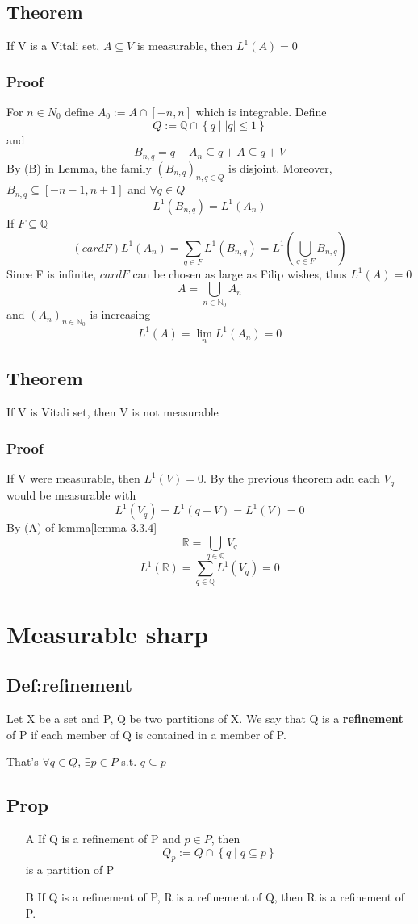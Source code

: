 \documentclass{book}
\newcommand{\abs}[1]{\left\lvert #1 \right\rvert}
\newcommand{\set}[1]{\left\{#1\right\}}
\begin{document}
\section{Theorem}
If V is a Vitali set, $A\subseteq V$ is measurable, then $L^1(A)=0$
\subsection*{Proof}
For $n\in N_0$ define $A_0:=A\cap[-n,n]$ which is integrable. Define $$Q:=\mathbb Q\cap\set{q\mid\abs{q}\leq 1}$$and $$B_{n,q}=q+A_n\subseteq q+A\subseteq q+V$$
By (B) in Lemma, the family $(B_{n,q})_{n,q\in Q}$ is disjoint. Moreover, $B_{n,q}\subseteq[-n-1,n+1]$ and $\forall q\in Q$
$$L^1(B_{n,q})=L^1(A_n)$$
If $F\subseteq \mathbb Q$
$$(card F)L^1(A_n)=\sum\limits_{q\in F}L^1(B_{n,q})=L^1\left(\bigcup\limits_{q\in F}B_{n,q}\right)$$
Since F is infinite, $card F$ can be chosen as large as Filip wishes, thus $L^1(A)=0$
$$A=\bigcup\limits_{n\in \mathbb N_0}A_n$$
and $(A_n)_{n\in \mathbb N_0}$ is increasing$$L^1(A)=\lim\limits_nL^1(A_n)=0$$
\section{Theorem}
If V is Vitali set, then V is not measurable
\subsection*{Proof}
If V were measurable, then $L^1(V)=0$. By the previous theorem adn each $V_q$ would be measurable with
$$L^1(V_q)=L^1(q+V)=L^1(V)=0$$
By (A) of lemma\ref{lemma 3.3.4}$$\mathbb R=\bigcup\limits_{q\in \mathbb Q}V_q$$
$$L^1(\mathbb R)=\sum\limits_{q\in \mathbb Q}L^1(V_q)=0$$
\chapter{Measurable sharp}
\section{Def:refinement}
Let X be a set and P, Q be two partitions of X. We say that Q is a \textbf{refinement} of P if each member of Q is contained in a member of P.

That's $\forall q\in Q$, $\exists p\in P$ s.t. $q\subseteq p$
\section{Prop}
\begin{itemize}
    \item [A] If Q is a refinement of P and $p\in P$, then$$Q_p:=Q\cap\set{q\mid q\subseteq p}$$is a partition of P
    \item [B] If Q is a refinement of P, R is a refinement of Q, then R is a refinement of P.
\end{itemize}
\end{document}
